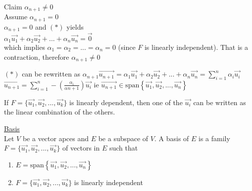 \documentclass[12pt]{article}
\renewcommand{\v}[1]{\overrightarrow{#1}}
\newcommand{\vectorset}[1]{\{\v{#1_1}, \v{#1_2}, ..., \v{#1_k}\}}
\newenvironment{proposition}{\block[Proposition]}{\endblock}
\newcommand{\bb}[1]{\left\{#1\right\}}
\newcommand{\pp}[1]{\left(#1\right)}
\newcommand{\sspan}[1]{\text{span}\bb{#1}}
\begin{document}
\begin{itemize}
	Claim $\alpha_{n+1} \ne 0$ \\
	Assume $\alpha_{n+1} = 0$ \\
	$\alpha_{n+1} = 0$ and $(*)$ yields \\
	$\alpha_1 \v{u_1} + \alpha_2 \v{u_2} + ... + \alpha_n \v{u_n} = \v{0}$ \\
	which implies $\alpha_1 = \alpha_2 = ... = \alpha_n = 0$ (since $F$ is linearly independent). That is a contraction, therefore $\alpha_{n+1} \ne 0$
	
	$(*)$ can be rewritten as $\alpha_{n+1} \v{u_{n+1}} = \alpha_1 \v{u_1} + \alpha_2 \v{u_2} + ... + \alpha_n \v{u_n} = \sum_{i=1}^n \alpha_i \v{u_i}$ \\
	$\v{u_{n+1}} = \sum_{i=1}^n -\pp{\frac{\alpha_i}{\alpha{n+1}}} \v{u_i}$ \qquad ie $\v{u_{n+1}} \in \sspan{\v{u_1}, \v{u_2}, ..., \v{u_n}}$
\end{itemize}

\begin{proposition}
	If $F = \vectorset{u}$ is linearly dependent, then one of the $\v{u_i}$ can be written as the linear combination of the others.
\end{proposition}

\underline{Basis} \\
Let $V$ be a vector apces and $E$ be a subspace of $V$. A basis of $E$ is a family $F = \vectorset{u}$ of vectors in $E$ such that

\begin{enumerate}
	\item $E = \sspan{\v{u_1}, \v{u_2}, ..., \v{u_n}}$
	\item $F = \vectorset{u}$ is linearly independent
\end{enumerate} 
\end{document}
